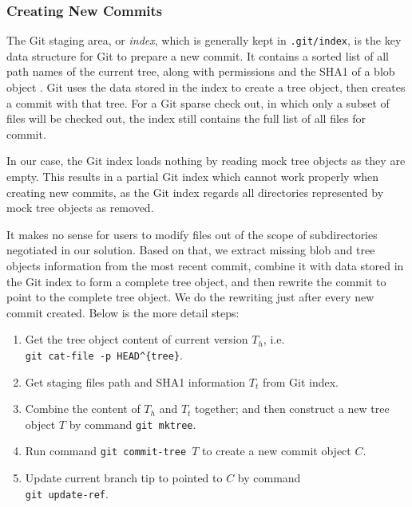 \documentclass[copyrightwanted=false]{sigplanconf}
\begin{document}
\subsubsection{Creating New Commits}\label{sec:create-new-commit}
The Git staging area, or \emph{index}, which is generally kept in \verb|.git/index|,
is the key data structure for Git to prepare a new commit.
It contains a sorted list of all path names of the current tree, along with
permissions and the SHA1 of a blob object \cite{idx-format}.
Git uses the data stored in the index to create a tree object, then creates a
commit with that tree.
For a Git sparse check out, in which only a subset of files will be checked
out, the index still contains the full list of all files for commit.

In our case, the Git index loads nothing by reading mock tree objects
as they are empty.
This results in a partial Git index which cannot work properly when creating new
commits, as the Git index regards all directories represented by mock tree
objects as removed.

It makes no sense for users to modify files out of the scope of
subdirectories negotiated in our solution.
Based on that, we extract missing blob and tree objects information from the
most recent commit, combine it with data stored in the Git index to form a
complete tree object, and then rewrite the commit to point to the complete tree
object.
We do the rewriting just after every new commit created.
Below is the more detail steps:

\begin{enumerate}
  \item Get the tree object content of current version $T_h$, i.e. \\
        \verb|git cat-file -p HEAD^{tree}|.

  \item Get staging files path and SHA1 information $T_t$ from Git index.

  \item Combine the content of $T_h$ and $T_t$ together; and then construct a
        new tree object $T$ by command \verb|git mktree|.

  \item Run command \verb|git commit-tree |$T$ to create a new commit object
        $C$.

  \item Update current branch tip to pointed to $C$ by command \\
        \verb|git update-ref|.
\end{enumerate}
\end{document}
